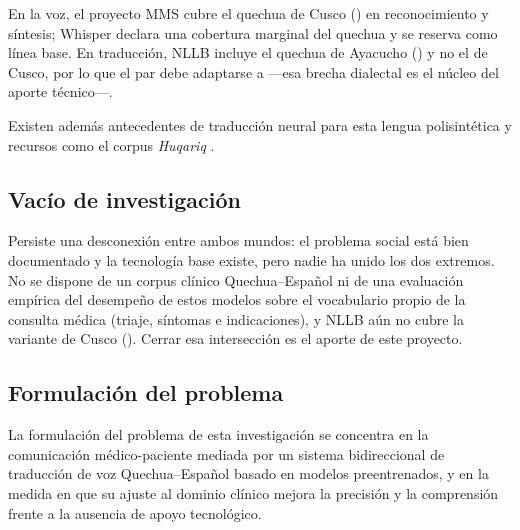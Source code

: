 
En la voz, el proyecto MMS \parencite{pratap2024mms} cubre el quechua de Cusco
() en reconocimiento y s{\'i}ntesis; Whisper \parencite{radford2023whisper} declara una
cobertura marginal del quechua y se reserva como l{\'i}nea base. En traducci{\'o}n, NLLB
\parencite{costajussa2022nllb} incluye el quechua de Ayacucho () y no el de Cusco, por lo
que el par debe adaptarse a  ---esa brecha dialectal es el n{\'u}cleo del aporte
t{\'e}cnico---.

Existen adem{\'a}s antecedentes de traducci{\'o}n neural para esta lengua
polisint{\'e}tica \parencite{ortega2020quechua,mager2021americasnlp} y recursos como el corpus
\emph{Huqariq} \parencite{zevallos2022huqariq}.

\subsection{Vac{\'i}o de investigaci{\'o}n}
Persiste una desconexi{\'o}n entre ambos mundos: el problema social est{\'a} bien documentado y la
tecnolog{\'i}a base existe, pero nadie ha unido los dos extremos. No se dispone de un corpus
cl{\'i}nico Quechua--Espa{\~n}ol ni de una evaluaci{\'o}n emp{\'i}rica del desempe{\~n}o de estos
modelos sobre el vocabulario propio de la consulta m{\'e}dica (triaje, s{\'i}ntomas e indicaciones),
y NLLB a{\'u}n no cubre la variante de Cusco (). Cerrar esa intersecci{\'o}n es el aporte
de este proyecto.

\subsection{Formulaci{\'o}n del problema}
La formulaci{\'o}n del problema de esta investigaci{\'o}n se concentra en la comunicaci{\'o}n
m{\'e}dico-paciente mediada por un sistema bidireccional de traducci{\'o}n de voz Quechua--Espa{\~n}ol
basado en modelos preentrenados, y en la medida en que su ajuste al dominio cl{\'i}nico mejora la
precisi{\'o}n y la comprensi{\'o}n frente a la ausencia de apoyo tecnol{\'o}gico.

